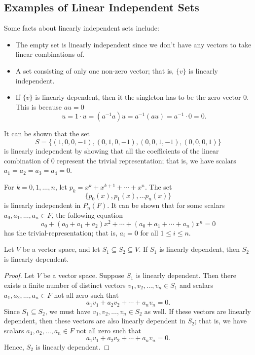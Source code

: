 \subsection{Examples of Linear Independent Sets}

Some facts about linearly independent sets include:
\begin{itemize}
    \item The empty set is linearly independent since we don't have any vectors to take linear combinations of.
    \item A set consisting of only one non-zero vector; that is, \( \{ v  \}  \) is linearly independent.
    \item If \( \{ v  \}  \) is linearly dependent, then it the singleton has to be the zero vector \( 0 \). This is because \( au = 0  \) 
        \[  u = 1 \cdot u =  (a^{-1} a ) u = a^{-1} (au) = a^{-1} \cdot 0 = 0.    \]
\end{itemize}

\begin{eg}\label{A set of vectors in R4}
     It can be shown that the set
    \[  S = \{ (1,0,0,-1) , (0,1,0,-1) , (0,0,1,-1), (0,0,0,1) \}  \] is linearly independent by showing that all the coefficients of the linear combination of 0 represent the trivial representation; that is, we have scalars \( a_{1} = a_{2} = a_{3} = a_{4} = 0  \).
\end{eg}

\begin{eg}\label{Linearly Independent Set of Polys}
    For \( k = 0,1, \dots, n  \), let \( p_{k} = x^{k } + x^{k+1}  + \cdots + x^{n}  \). The set 
    \[  \{ p_{0}(x), p_{1}(x), \dots p_{n}(x) \}  \] is linearly independent in \( P_{n}(F) \).
    It can be shown that for some scalars \( a_{0}, a_{1} , \dots , a_{n} \in F   \),  the following equation 
    \[  a_{0} + (a_{0} + a_{1} + a_{2})x^{2} + \cdots + (a_{0} + a_{1} + \cdots + a_{n})x^{n} = 0  \]
    has the trivial-representation; that is, \( a_{i} = 0  \) for all \( 1 \leq i \leq n \).
\end{eg}

\begin{theorem}
    Let \( V  \) be a vector space, and let \( S_{1} \subseteq S_{2} \subseteq V  \). If \( S_{1}  \) is linearly dependent, then \( S_{2}  \) is linearly dependent.
\end{theorem}
\begin{proof}
Let \( V  \) be a vector space. Suppose \( S_{1}  \) is linearly dependent. Then there exists a finite number of distinct vectors \( v_{1}, v_{2}, \dots, v_{n} \in S_{1}  \) and scalars \( a_{1}, a_{2}, \dots, a_{n} \in F  \) not all zero such that 
\[  a_{1} v_{1} + a_{2} v_{2} + \cdots + a_{n} v_{n} = 0.  \]
Since \( S_{1} \subseteq S_{2}  \), we must have \( v_{1} , v_{2}, \dots, v_{n} \in S_{2} \) as well. If these vectors are linearly dependent, then these vectors are also linearly dependent in \( S_{2} \); that is, we have scalars \( a_{1}, a_{2}, \dots, a_{n} \in F  \) not all zero such that  
\[  a_{1} v_{1} + a_{2} v_{2} + \cdots + a_{n} v_{n} = 0.  \]
Hence, \( S_{2}  \) is linearly dependent.
\end{proof}

